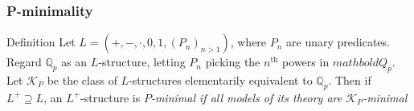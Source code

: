 \begin{frame}[t]\frametitle{P-minimality}
    
	\begin{beamerboxesrounded}[shadow=true]{Definition}
		Let $L=(+,-,\cdot,0,1,(P_{n})_{n>1})$, where $P_n$ are unary
		predicates. Regard $\mathbb{Q}_p$ as an $L$-structure, letting $P_n$ picking the $n^{\text{th}}$ powers in $mathbold{Q_p}$.
		Let $\mathcal{K}_P$ be the class of $L$-structures elementarily equivalent to $\mathbb{Q}_p$. 
		Then if $L^{+}\supseteq L$, an $L^{+}$-structure is \em $P$-minimal \em
		if all models of its theory are $\mathcal{K}_P$-minimal
	\end{beamerboxesrounded}

\end{frame}